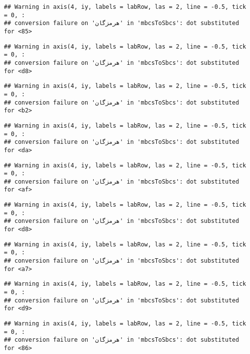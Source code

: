 \documentclass[
]{article}
\begin{document}
\begin{verbatim}
## Warning in axis(4, iy, labels = labRow, las = 2, line = -0.5, tick = 0, :
## conversion failure on 'هرمزگان' in 'mbcsToSbcs': dot substituted for <85>
\end{verbatim}

\begin{verbatim}
## Warning in axis(4, iy, labels = labRow, las = 2, line = -0.5, tick = 0, :
## conversion failure on 'هرمزگان' in 'mbcsToSbcs': dot substituted for <d8>
\end{verbatim}

\begin{verbatim}
## Warning in axis(4, iy, labels = labRow, las = 2, line = -0.5, tick = 0, :
## conversion failure on 'هرمزگان' in 'mbcsToSbcs': dot substituted for <b2>
\end{verbatim}

\begin{verbatim}
## Warning in axis(4, iy, labels = labRow, las = 2, line = -0.5, tick = 0, :
## conversion failure on 'هرمزگان' in 'mbcsToSbcs': dot substituted for <da>
\end{verbatim}

\begin{verbatim}
## Warning in axis(4, iy, labels = labRow, las = 2, line = -0.5, tick = 0, :
## conversion failure on 'هرمزگان' in 'mbcsToSbcs': dot substituted for <af>
\end{verbatim}

\begin{verbatim}
## Warning in axis(4, iy, labels = labRow, las = 2, line = -0.5, tick = 0, :
## conversion failure on 'هرمزگان' in 'mbcsToSbcs': dot substituted for <d8>
\end{verbatim}

\begin{verbatim}
## Warning in axis(4, iy, labels = labRow, las = 2, line = -0.5, tick = 0, :
## conversion failure on 'هرمزگان' in 'mbcsToSbcs': dot substituted for <a7>
\end{verbatim}

\begin{verbatim}
## Warning in axis(4, iy, labels = labRow, las = 2, line = -0.5, tick = 0, :
## conversion failure on 'هرمزگان' in 'mbcsToSbcs': dot substituted for <d9>
\end{verbatim}

\begin{verbatim}
## Warning in axis(4, iy, labels = labRow, las = 2, line = -0.5, tick = 0, :
## conversion failure on 'هرمزگان' in 'mbcsToSbcs': dot substituted for <86>
\end{verbatim}
\end{document}
